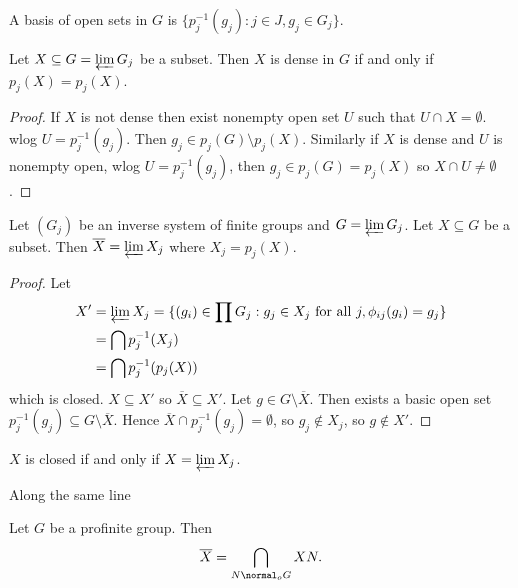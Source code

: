 \documentclass[a4paper]{article}
\begin{document}
\begin{corollary}
  A basis of open sets in \(G\) is \(\{p_j^{-1}(g_j): j \in J, g_j \in G_j\}\).
\end{corollary}

\begin{corollary}
  Let \(X \subseteq G = \varprojlim G_j\) be a subset. Then \(X\) is dense in \(G\) if and only if \(p_j(X) = p_j(X)\).
\end{corollary}

\begin{proof}
  If \(X\) is not dense then exist nonempty open set \(U\) such that \(U \cap X = \emptyset\). wlog \(U = p_j^{-1}(g_j)\). Then \(g_j \in p_j(G) \setminus p_j(X)\). Similarly if \(X\) is dense and \(U\) is nonempty open, wlog \(U = p_j^{-1}(g_j)\), then \(g_j \in p_j(G) = p_j(X)\) so \(X \cap U \ne \emptyset\).
\end{proof}

\begin{proposition}
  Let \((G_j)\) be an inverse system of finite groups and \(G = \varprojlim G_j\). Let \(X \subseteq G\) be a subset. Then \(\overline X = \varprojlim X_j\) where \(X_j = p_j(X)\).
\end{proposition}

\begin{proof}
  Let
  \begin{align*}
    X'
    &= \varprojlim X_j
    = \{(g_i) \in \prod G_j: g_j \in X_j \text{ for all } j, \phi_{ij}(g_i) = g_j\} \\
    &= \bigcap p_j^{-1}(X_j) \\
    &= \bigcap p_j^{-1}(p_j(X))
  \end{align*}
  which is closed. \(X \subseteq X'\) so \(\overline X \subseteq X'\). Let \(g \in G \setminus \overline X\). Then exists a basic open set \(p_j^{-1}(g_j) \subseteq G \setminus \overline X\). Hence \(\overline X \cap p_j^{-1}(g_j) = \emptyset\), so \(g_j \notin X_j\), so \(g \notin X'\).
\end{proof}

\begin{corollary}
  \(X\) is closed if and only if \(X = \varprojlim X_j\).
\end{corollary}

Along the same line

\begin{proposition}
  Let \(G\) be a profinite group. Then
  \[
    \overline X = \bigcap_{N \normal_o G} XN.
  \]
\end{proposition}
\end{document}
